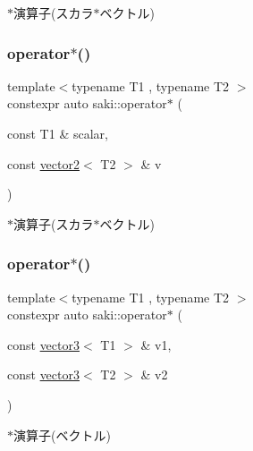 $\ast$演算子(スカラ$\ast$ベクトル) 

\mbox{\label{namespacesaki_a7d5d04727e813b089aadf4b97247b64a}} 
\subsubsection{\texorpdfstring{operator$\ast$()}{operator*()}\hspace{0.1cm}{\footnotesize\ttfamily [8/14]}}
{\footnotesize\ttfamily template$<$typename T1 , typename T2 $>$ \\
constexpr auto saki\+::operator$\ast$ (\begin{DoxyParamCaption}\item[{const T1 \&}]{scalar,  }\item[{const \mbox{\hyperlink{classsaki_1_1vector2}{vector2}}$<$ T2 $>$ \&}]{v }\end{DoxyParamCaption})}



$\ast$演算子(スカラ$\ast$ベクトル) 

\mbox{\label{namespacesaki_a59d261ceb3780fa55acc164671b67992}} 
\subsubsection{\texorpdfstring{operator$\ast$()}{operator*()}\hspace{0.1cm}{\footnotesize\ttfamily [9/14]}}
{\footnotesize\ttfamily template$<$typename T1 , typename T2 $>$ \\
constexpr auto saki\+::operator$\ast$ (\begin{DoxyParamCaption}\item[{const \mbox{\hyperlink{classsaki_1_1vector3}{vector3}}$<$ T1 $>$ \&}]{v1,  }\item[{const \mbox{\hyperlink{classsaki_1_1vector3}{vector3}}$<$ T2 $>$ \&}]{v2 }\end{DoxyParamCaption})}



$\ast$演算子(ベクトル) 

\mbox{\label{namespacesaki_a19656e376d8720e2a67f3d08082770b0}} 
